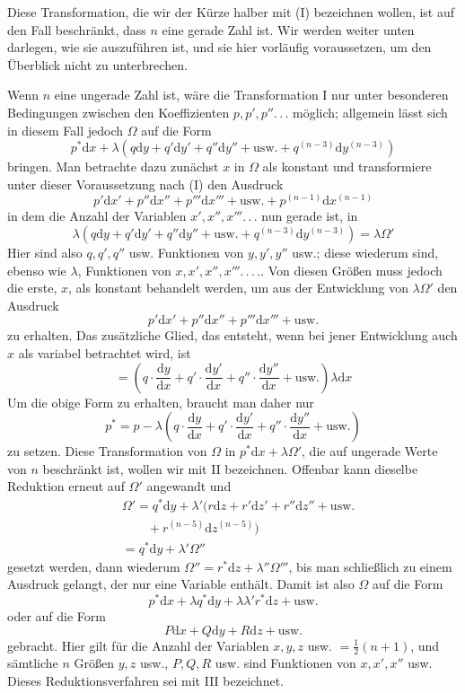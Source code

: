 Diese Transformation, die wir der Kürze halber mit (I) bezeichnen wollen, ist auf den Fall beschränkt, dass $n$ eine gerade Zahl ist. Wir werden weiter unten%
 darlegen, wie sie auszuführen ist, und sie hier vorläufig voraussetzen, um den Überblick nicht zu unterbrechen.
\par
Wenn $n$ eine ungerade Zahl ist, wäre die Transformation I nur unter besonderen Bedingungen zwischen den Koeffizienten $p,p',p''.\,.\,.$ möglich; allgemein lässt sich in diesem Fall jedoch $\Omega$ auf die Form
\[
p^{*}\mathrm{d}x+\lambda(q\mathrm{d}y+q'\mathrm{d}y'+q''\mathrm{d}y''+\mathrm{usw.}
+q^{(n-3)}\mathrm{d}y^{(n-3)})
\]
bringen. Man betrachte dazu zunächst $x$ in $\Omega$ als konstant und transformiere unter dieser Voraussetzung nach (I) den Ausdruck
\[
p'\mathrm{d}x'+p''\mathrm{d}x''+p'''\mathrm{d}x'''+\mathrm{usw.}
+p^{(n-1)}\mathrm{d}x^{(n-1)}
\]
in dem die Anzahl der Variablen $x',x'',x'''.\,.\,.$ nun gerade ist, in
\[
\lambda(q\mathrm{d}y+q'\mathrm{d}y'+q''\mathrm{d}y''+\mathrm{usw.}
+q^{(n-3)}\mathrm{d}y^{(n-3)})=\lambda\Omega'
\]
Hier sind also $q,q',q''$ usw. Funktionen von $y,y',y''$ usw.; diese wiederum sind, ebenso wie $\lambda$, Funktionen von $x,x',x'',x'''.\,.\,.\,.$. Von diesen Größen muss jedoch die erste, $x$, als konstant behandelt werden, um aus der Entwicklung von $\lambda\Omega'$ den Ausdruck
\[
p'\mathrm{d}x'+p''\mathrm{d}x''+p'''\mathrm{d}x'''+\mathrm{usw.}
\]
zu erhalten. Das zusätzliche Glied, das entsteht, wenn bei jener Entwicklung auch $x$ als variabel betrachtet wird, ist
\[
=(q\cdot\frac{\mathrm{d}y}{\mathrm{d}x}
+q'\cdot\frac{\mathrm{d}y'}{\mathrm{d}x}
+q''\cdot\frac{\mathrm{d}y''}{\mathrm{d}x}+\mathrm{usw.})\lambda\mathrm{d}x
\]
Um die obige Form zu erhalten, braucht man daher nur
\[
p^{*}=p-\lambda(q\cdot\frac{\mathrm{d}y}{\mathrm{d}x}
+q'\cdot\frac{\mathrm{d}y'}{\mathrm{d}x}
+q''\cdot\frac{\mathrm{d}y''}{\mathrm{d}x}+\mathrm{usw.})
\]
zu setzen. Diese Transformation von $\Omega$ in $p^{*}\mathrm{d}x+\lambda\Omega'$, die auf ungerade Werte von $n$ beschränkt ist, wollen wir mit II bezeichnen. Offenbar kann dieselbe Reduktion erneut auf $\Omega'$ angewandt und
\[
\begin{aligned}
&\Omega'=q^{*}\mathrm{d}y+\lambda'(r\mathrm{d}z+r'\mathrm{d}z'+r''\mathrm{d}z''+\mathrm{usw.}\\&\qquad+r^{(n-5)}\mathrm{d}z^{(n-5)})\\
&=q^{*}\mathrm{d}y+\lambda'\Omega''
\end{aligned}
\]
gesetzt werden, dann wiederum $\Omega''=r^{*}\mathrm{d}z+\lambda''\Omega'''$, bis man schließlich zu einem Ausdruck gelangt, der nur eine Variable enthält. Damit ist also $\Omega$ auf die Form
\[
p^{*}\mathrm{d}x+\lambda q^{*}\mathrm{d}y+\lambda\lambda'r^{*}\mathrm{d}z+\mathrm{usw.}
\]
oder auf die Form
\[
P\mathrm{d}x+Q\mathrm{d}y+R\mathrm{d}z+\mathrm{usw.}
\]
gebracht. Hier gilt für die Anzahl der Variablen $x,y,z$ usw. $=\frac12(n+1)$, und sämtliche $n$ Größen $y,z$ usw., $P,Q,R$ usw. sind Funktionen von $x,x',x''$ usw. Dieses Reduktionsverfahren sei mit III bezeichnet.

